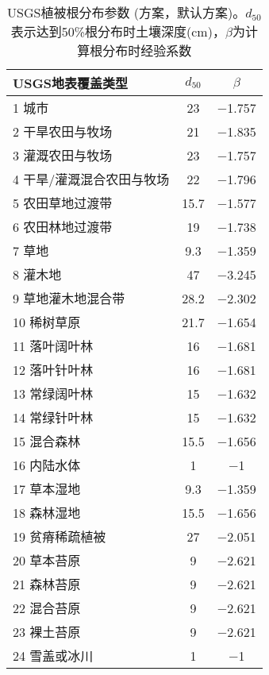 \begin{table}[htbp]
  \centering
  \caption[USGS植被根分布参数(\citet{schenk2002rooting}方案)]{USGS植被根分布参数 (\citet{schenk2002rooting}方案，默认方案)。$d_{50}$表示达到50\%根分布时土壤深度(cm)，$\beta$为计算根分布时经验系数}
  \label{tab:USGSSchenkANDJackson2002方案默认方案}
  \begin{tabular}{@{}lcc@{}}
    \toprule
    USGS地表覆盖类型          & $d_{50}$ & $\beta$         \\ \midrule
    1 城市                    & 23       & \num{ -1.757  } \\
    2 干旱农田与牧场          & 21       & \num{ -1.835  } \\
    3 灌溉农田与牧场          & 23       & \num{ -1.757  } \\
    4 干旱/灌溉混合农田与牧场 & 22       & \num{ -1.796  } \\
    5 农田草地过渡带          & 15.7     & \num{ -1.577  } \\
    6 农田林地过渡带          & 19       & \num{ -1.738  } \\
    7 草地                    & 9.3      & \num{ -1.359  } \\
    8 灌木地                  & 47       & \num{ -3.245  } \\
    9 草地灌木地混合带        & 28.2     & \num{ -2.302  } \\
    10 稀树草原               & 21.7     & \num{ -1.654  } \\
    11 落叶阔叶林             & 16       & \num{ -1.681  } \\
    12 落叶针叶林             & 16       & \num{ -1.681  } \\
    13 常绿阔叶林             & 15       & \num{ -1.632  } \\
    14 常绿针叶林             & 15       & \num{ -1.632  } \\
    15 混合森林               & 15.5     & \num{ -1.656  } \\
    16 内陆水体               & 1        & \num{ -1      } \\
    17 草本湿地               & 9.3      & \num{ -1.359  } \\
    18 森林湿地               & 15.5     & \num{ -1.656  } \\
    19 贫瘠稀疏植被           & 27       & \num{ -2.051  } \\
    20 草本苔原               & 9        & \num{ -2.621  } \\
    21 森林苔原               & 9        & \num{ -2.621  } \\
    22 混合苔原               & 9        & \num{ -2.621  } \\
    23 裸土苔原               & 9        & \num{ -2.621  } \\
    24 雪盖或冰川             & 1        & \num{ -1      } \\ \bottomrule
  \end{tabular}
\end{table}


